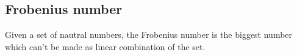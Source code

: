 
\subsection{Frobenius number}

Given a set of nautral numbers, the Frobenius number is the biggest number which can't be made as linear combination of the set.


